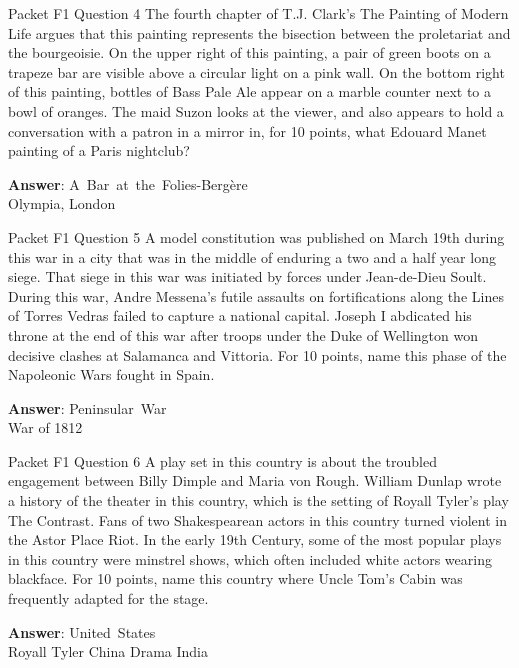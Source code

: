 \begin{frame}{Packet F1 Question 4}
The fourth chapter of T.J. Clark’s The Painting of Modern Life argues that this painting represents the   bisection between the proletariat and the bourgeoisie. On the upper right of this painting, a pair of green boots on a trapeze bar are visible   above a circular light on a pink wall. On the bottom right   of this painting, bottles of Bass Pale Ale appear on a marble counter next to a bowl of oranges.   The maid Suzon looks at the viewer, and also appears to hold a conversation with a patron in a mirror in, for 10 points, what Edouard Manet   painting of a Paris nightclub?

\textbf{Answer}: A\ Bar\ at\ the\ Folies-Bergère\\
 Olympia, London
\end{frame}

\begin{frame}{Packet F1 Question 5}
A model constitution was published on March 19th during this war in a city that was in the middle of enduring a two and a half year long siege. That siege in this war was initiated by forces under Jean-de-Dieu Soult. During this war, Andre Messena’s   futile assaults on fortifications along the Lines of Torres Vedras failed     to capture a national capital. Joseph I abdicated his throne at the end of this war after troops under the Duke of Wellington won decisive   clashes at Salamanca and Vittoria. For 10 points, name this phase of the Napoleonic Wars fought in   Spain.

\textbf{Answer}: Peninsular\ War\\
 War of 1812
\end{frame}

\begin{frame}{Packet F1 Question 6}
A play set in this country is about the troubled engagement between Billy Dimple and Maria von Rough. William Dunlap wrote a history of the theater in this country,   which is the setting of Royall Tyler’s play The Contrast. Fans of two Shakespearean actors in this country turned violent in the Astor Place Riot. In the early 19th Century, some of the most popular plays in this country were minstrel shows, which often included white actors wearing blackface. For 10 points, name this country where Uncle Tom’s Cabin was frequently adapted for the stage.      

\textbf{Answer}: United\ States\\
 Royall Tyler
 China
 Drama
 India
\end{frame}

